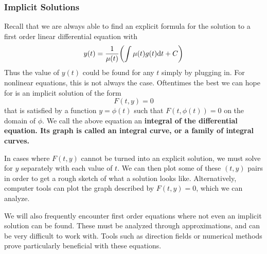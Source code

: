 \subsubsection{Implicit Solutions}
Recall that we are always able to find an explicit formula for the solution to a first order linear differential equation with
\[ y(t) = \frac{1}{\mu(t)}\pqty{\int \mu(t)g(t)\dd t + C}\]
Thus the value of $y(t)$ could be found for any $t$ simply by plugging in. For nonlinear equations, this is not always the case. Oftentimes the best we can hope for is an implicit solution of the form
\[ F(t, y) = 0 \]
that is satisfied by a function $y = \phi(t)$ such that $F(t, \phi(t)) = 0$ on the domain of $\phi$. We call the above equation an \bf{integral} of the differential equation. Its graph is called an \bf{integral curve}, or a family of integral curves. \par
In cases where $F(t,y)$ cannot be turned into an explicit solution, we must solve for $y$ separately with each value of $t$. We can then plot some of these $(t,y)$ pairs in order to get a rough sketch of what a solution looks like. Alternatively, computer tools can plot the graph described by $F(t,y)=0$, which we can analyze. \par
We will also frequently encounter first order equations where not even an implicit solution can be found. These must be analyzed through approximations, and can be very difficult to work with. Tools such as direction fields or numerical methods prove particularly beneficial with these equations.
